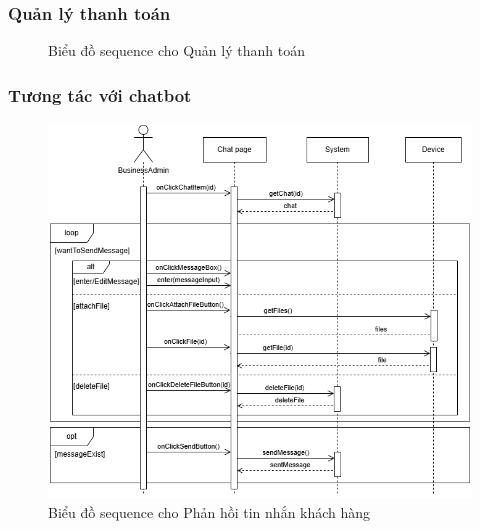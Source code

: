 \subsubsection{Quản lý thanh toán}
\begin{figure}[H]
    \centering
     
    \vspace{0.5cm}
    \caption{Biểu đồ sequence cho Quản lý thanh toán}
    \label{fig:enter-label}
\end{figure}
\subsubsection{Tương tác với chatbot}
\begin{figure}[H]
    \centering
     \includegraphics[width=1\textwidth]{Dg_Sequence/ReplyCustomerMessage.png}
    \vspace{0.5cm}
    \caption{Biểu đồ sequence cho Phản hồi tin nhắn khách hàng}
    \label{fig:enter-label}
\end{figure}
